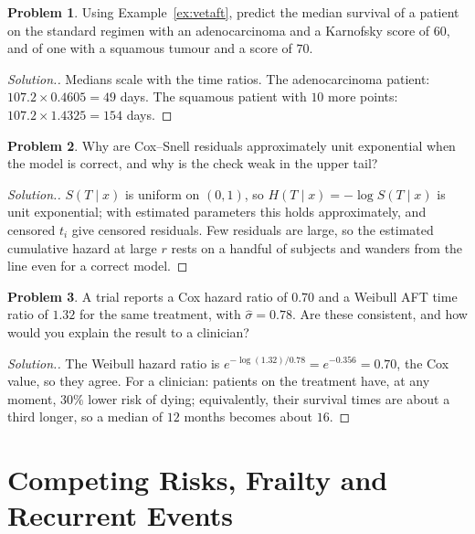 \documentclass[11pt,a4paper]{article}
\numberwithin{equation}{section}
\theoremstyle{definition}
\newtheorem{problemx}{Problem}[subsection]
\newenvironment{problem}{\begin{problemx}}{\end{problemx}}
\newenvironment{solution}
  {\renewcommand{\qedsymbol}{}\begin{proof}[\textit{Solution}.]}
  {\end{proof}}
\begin{document}
\begin{problem}
Using Example~\ref{ex:vetaft}, predict the median survival of a patient on the standard regimen with an adenocarcinoma and a Karnofsky score of $60$, and of one with a squamous tumour and a score of $70$.
\end{problem}

\begin{solution}
Medians scale with the time ratios. The adenocarcinoma patient: $107.2 \times 0.4605 = 49$ days. The squamous patient with $10$ more points: $107.2 \times 1.4325 = 154$ days.
\end{solution}

\begin{problem}
Why are Cox--Snell residuals approximately unit exponential when the model is correct, and why is the check weak in the upper tail?
\end{problem}

\begin{solution}
$S(T \mid x)$ is uniform on $(0, 1)$, so $H(T \mid x) = -\log S(T \mid x)$ is unit exponential; with estimated parameters this holds approximately, and censored $t_i$ give censored residuals. Few residuals are large, so the estimated cumulative hazard at large $r$ rests on a handful of subjects and wanders from the line even for a correct model.
\end{solution}

\begin{problem}
A trial reports a Cox hazard ratio of $0.70$ and a Weibull AFT time ratio of $1.32$ for the same treatment, with $\hat\sigma = 0.78$. Are these consistent, and how would you explain the result to a clinician?
\end{problem}

\begin{solution}
The Weibull hazard ratio is $e^{-\log(1.32)/0.78} = e^{-0.356} = 0.70$, the Cox value, so they agree. For a clinician: patients on the treatment have, at any moment, $30\%$ lower risk of dying; equivalently, their survival times are about a third longer, so a median of $12$ months becomes about $16$.
\end{solution}

\section{Competing Risks, Frailty and Recurrent Events}
\label{sec:multi}
\end{document}
